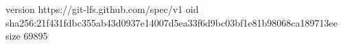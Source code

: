 version https://git-lfs.github.com/spec/v1
oid sha256:21f431fdbc355ab43d0937e14007d5ea33f6d9bc03bf1e81b98068ca189713ee
size 69895
